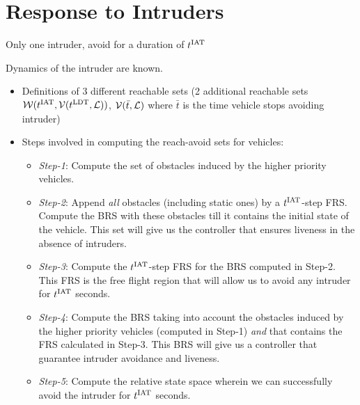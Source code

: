 \section{Response to Intruders \label{sec:HJIVI}}
\begin{assumption}
\label{as:avoidOnce}
Only one intruder, avoid for a duration of $t^\text{IAT}$
\end{assumption}
\begin{assumption}
Dynamics of the intruder are known. 
\end{assumption}

\begin{itemize}
\item Definitions of 3 different reachable sets (2 additional reachable sets $\mathcal{W}(t^\text{IAT}, \mathcal{V}(t^\text{LDT}, \mathcal{L}))$, $\mathcal{V}(\bar t, \mathcal{L})$ where $\bar t$ is the time vehicle stops avoiding intruder)

\item Steps involved in computing the reach-avoid sets for vehicles:
\begin{itemize}
\item \textit{Step-1}: Compute the set of obstacles induced by the higher priority vehicles. 
\item \textit{Step-2}: Append \textit{all} obstacles (including static ones) by a $t^\text{IAT}$-step FRS. Compute the BRS with these obstacles till it contains the initial state of the vehicle. This set will give us the controller that ensures liveness in the absence of intruders. 
\item \textit{Step-3}: Compute the $t^\text{IAT}$-step FRS for the BRS computed in Step-2. This FRS is the free flight region that will allow us to avoid any intruder for $t^\text{IAT}$ seconds. 
\item \textit{Step-4}: Compute the BRS taking into account the obstacles induced by the higher priority vehicles (computed in Step-1) \textit{and} that contains the FRS calculated in Step-3. This BRS will give us a controller that guarantee intruder avoidance and liveness. 
\item \textit{Step-5}: Compute the relative state space wherein we can successfully avoid the intruder for $t^\text{IAT}$ seconds. 
\end{itemize}
\end{itemize}

